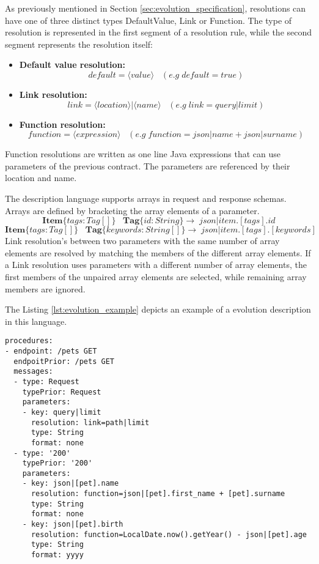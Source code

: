 As previously mentioned in Section \ref{sec:evolution_specification}, resolutions can have one of three distinct types DefaultValue, Link or Function.
The type of resolution is represented in the first segment of a resolution rule, while the second segment represents the resolution itself:

\begin{itemize}
    \item \textbf{Default value resolution:} \[ default=\langle value\rangle \;\;\;(e.g\;default=true) \]
    \item \textbf{Link resolution:} \[ link=\langle location\rangle|\langle name\rangle \;\;\;(e.g\;link=query|limit) \]
    \item \textbf{Function resolution:} \[ function=\langle expression\rangle \;\;\;(e.g\;function=json|name + json|surname) \]
\end{itemize}

Function resolutions are written as one line Java expressions that can use parameters of the previous contract. The
parameters are referenced by their location and name.

The description language supports arrays in request and response schemas.
Arrays are defined by bracketing the array elements of a parameter.
\[ \mathbf{Item}\bm{\{}tags:Tag[]\bm{\}}\;\;\;\mathbf{Tag}\bm{\{}id:String\bm{\}} \rightarrow \;json|item.[tags].id \]
\[ \mathbf{Item}\bm{\{}tags:Tag[]\bm{\}}\;\;\;\mathbf{Tag}\bm{\{}keywords:String[]\bm{\}} \rightarrow \;json|item.[tags].[keywords] \]
Link resolution's between two parameters with the same number of array elements are resolved by matching the members of the different array elements.
If a Link resolution uses parameters with a different number of array elements, the first members of the unpaired array elements are selected, while remaining array members are ignored.

The Listing \ref{lst:evolution_example} depicts an example of a evolution description in this language.

\begin{lstlisting}[caption=Evolution specification example, label=lst:evolution_example, captionpos=b]
procedures:
- endpoint: /pets GET
  endpoitPrior: /pets GET
  messages:
  - type: Request
    typePrior: Request
    parameters:
    - key: query|limit
      resolution: link=path|limit
      type: String
      format: none
  - type: '200'
    typePrior: '200'
    parameters:
    - key: json|[pet].name
      resolution: function=json|[pet].first_name + [pet].surname
      type: String
      format: none
    - key: json|[pet].birth
      resolution: function=LocalDate.now().getYear() - json|[pet].age
      type: String
      format: yyyy
\end{lstlisting}

